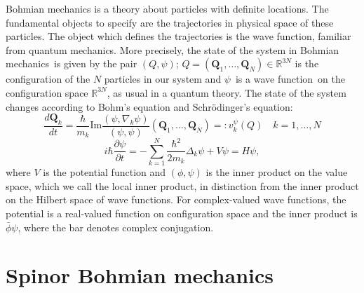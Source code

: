 \documentclass[11pt]{article}
\theoremstyle{remark}
\begin{document}
Bohmian mechanics is a theory about 
 particles with definite locations. The fundamental objects to specify
 are  the trajectories in physical space of these particles. 
The object which
 defines the trajectories is 
the wave function, familiar from quantum
 mechanics. More precisely,  the state of the system in Bohmian mechanics\ is given by the
 pair $(Q, \ensuremath{\psi})$; $Q = 
(\boldsymbol Q_1, \ldots, \boldsymbol Q_N) \in \ensuremath{\mathbb{R}^{\ensuremath{3} N}}$
is the configuration of the $N$ particles in our system  and \ensuremath{\psi}\ is
a  wave function\ 
on the configuration space \ensuremath{\mathbb{R}^{\ensuremath{3} N}}, as usual in a quantum theory.
The state of the system changes according to Bohm's equation and Schr\"odinger's equation: 
\begin{equation} \label{e:bohm}
\ensuremath{\frac{d{\boldsymbol{Q}_{k}}}{d{t}}} = \ensuremath{\frac{\hbar}{m_{k}}} \textrm{Im}
\frac {\ensuremath{({\ensuremath{\psi}}, {\nabla_{k} \ensuremath{\psi}})}}{ \ensuremath{({\ensuremath{\psi}}, {\ensuremath{\psi}})}}
(\boldsymbol{Q}_1,\ldots, \boldsymbol{Q}_N) \ensuremath{=:} v_k^{\ensuremath{\psi}} (Q) 
 \quad  k= 1,\ldots,N
\end{equation} 
\begin{equation}
\ensuremath{i \hbar \ensuremath{\frac{\partial {\ensuremath{\psi}}}{\partial {t}}} = - \sum_{k =
1}^{N} \ensuremath{\frac{\hbar^2}{2m_{k}}} \ensuremath{\Delta}_{k} \ensuremath{\psi} + V \ensuremath{\psi}   } = H\ensuremath{\psi},
\end{equation}
where $V$ is the potential function and \ensuremath{({\phi}, {\ensuremath{\psi}})} is the 
inner product on the value space, which we call the local inner
product, in distinction from the inner product on the Hilbert space of
wave functions. For complex-valued wave functions, the
potential is  a real-valued
function on configuration space and the inner product is 
$\bar{\phi}{\ensuremath{\psi}}$, where the bar denotes complex conjugation. 


\section{Spinor Bohmian mechanics}
\end{document}
